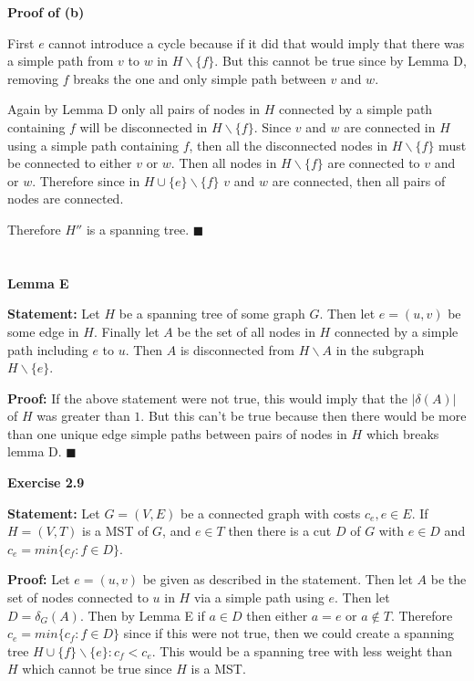 \documentclass{article}
\newcommand*{\QEDA}{\hfill\ensuremath{\blacksquare}}%
\begin{document}
\textbf{Proof of (b)} 

First $e$ cannot introduce a cycle because if it did that would imply that there was a simple path from $v$ to $w$ in $H \backslash \{f\}$. But this cannot be true since by Lemma D, removing $f$ breaks the one and only simple path between $v$ and $w$. 

Again by Lemma D only all pairs of nodes in $H$ connected by a simple path containing $f$ will be disconnected in $H \backslash \{f\}$. Since $v$ and $w$ are connected in $H$ using a simple path containing $f$, then all the disconnected nodes in $H \backslash \{f\}$ must be connected to either $v$ or $w$. Then all nodes in $H \backslash \{f\}$ are connected to $v$ and or $w$. Therefore since in $H \cup \{e\} \backslash \{f\}$ $v$ and $w$ are connected, then all pairs of nodes are connected. 

Therefore $H''$ is a spanning tree.
\QEDA

\section{}
\textbf{Lemma E}

\textbf{Statement:} Let $H$ be a spanning tree of some graph $G$. Then let $e = (u,v)$ be some edge in $H$. Finally let $A$ be the set of all nodes in $H$ connected by a simple path including $e$  to $u$. Then $A$ is disconnected from $H \backslash A$ in the subgraph $H \backslash \{e\}$.

\textbf{Proof:} If the above statement were not true, this would imply that the $|\delta(A)|$ of $H$ was greater than $1$. But this can't be true because then there would be more than one unique edge simple paths between pairs of nodes in $H$ which breaks lemma D.
\QEDA

\textbf{Exercise 2.9}

\textbf{Statement:} Let $G = (V,E)$ be a connected graph with costs $c_e, e \in E$. If $H = (V,T)$ is a MST of $G$, and $e \in T$ then there is a cut $D$ of $G$ with $e \in D$ and $c_e = min\{c_f : f \in D\}$.

\textbf{Proof:} Let $e = (u,v)$ be given as described in the statement. Then let $A$ be the set of nodes connected to $u$ in $H$ via a simple path using $e$. Then let $D = \delta_G(A)$. Then by Lemma E if $a \in D$ then either $a = e$ or $a \notin T$. Therefore 
$c_e = min\{c_f : f \in D\}$ since if this were not true, then we could create a spanning tree $H \cup \{f\} \backslash \{e\} : c_f < c_e$. This would be a spanning tree with less weight than $H$ which cannot be true since $H$ is a MST.


 
\end{document}
